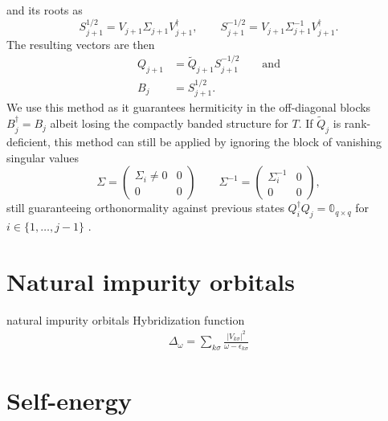 and its roots as
\begin{equation}
    S_{j+1}^{1/2}  = V_{j+1} \Sigma_{j+1} V_{j+1}^\dagger,
    \qquad
    S_{j+1}^{-1/2} = V_{j+1} \Sigma_{j+1}^{-1} V_{j+1}^\dagger.
\end{equation}
The resulting vectors are then
\begin{align}
    Q_{j+1} & = \tilde Q_{j+1} S_{j+1}^{-1/2} \qquad \text{and} \\
    B_j     & = S_{j+1}^{1/2}.
\end{align}
We use this method as it guarantees hermiticity in the off-diagonal blocks $B_j^\dag = B_j$
albeit losing the compactly banded structure for $T$.
If $\tilde Q_j$ is rank-deficient,
this method can still be applied \cite{Brass2021} by ignoring the block of vanishing singular values
\begin{equation}
    \Sigma =
    \begin{pmatrix}
        \Sigma_i \neq 0 & 0 \\
        0               & 0
    \end{pmatrix}
    \qquad
    \Sigma^{-1} =
    \begin{pmatrix}
        \Sigma_i^{-1} & 0 \\
        0             & 0
    \end{pmatrix},
\end{equation}
still guaranteeing orthonormality against previous states $Q_i^\dag Q_j = \mathbb{0}_{q\times q}$
for $i \in \{1,\ldots,j-1\}$ \cite{Golub2013}.

\section{Natural impurity orbitals}

natural impurity orbitals
Hybridization function
\begin{align}
    \Delta_\omega = \sum_{k\sigma} \frac{|V_{k\sigma}|^2}{\omega - \epsilon_{k\sigma}}
\end{align}

\section{Self-energy}

